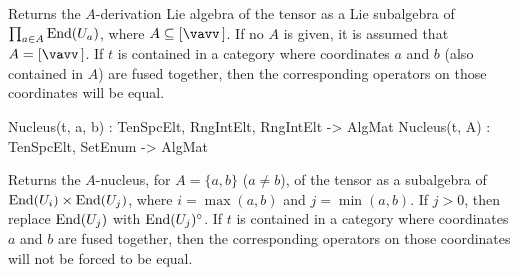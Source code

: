 \documentclass{documentation}
\begin{document}
Returns the $A$-derivation Lie algebra of the tensor as a Lie subalgebra of $\prod_{a\in A}\operatorname{End}(U_a)$, where $A\subseteq [\vav]$.
If no $A$ is given, it is assumed that $A=[\vav]$. 
If $t$ is contained in a category where coordinates $a$ and $b$ (also contained in $A$) are fused together, then the corresponding operators on those coordinates will be equal.

\begin{intrinsics}
Nucleus(t, a, b) : TenSpcElt, RngIntElt, RngIntElt -> AlgMat
Nucleus(t, A) : TenSpcElt, SetEnum -> AlgMat
\end{intrinsics}

Returns the $A$-nucleus, for $A=\{a,b\}$ ($a\ne b$), of the tensor as a subalgebra of $\operatorname{End}(U_i)\times \operatorname{End}(U_j)$, 
where $i=\max(a,b)$ and $j=\min(a,b)$.
If $j>0$, then replace $\operatorname{End}(U_j)$ with $\operatorname{End}(U_j)^\circ$. 
If $t$ is contained in a category where coordinates $a$ and $b$ are fused together, then the corresponding operators on those coordinates will not be forced to be equal.
\end{document}
